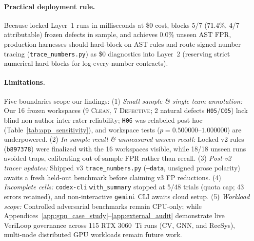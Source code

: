 \paragraph{Practical deployment rule.}
Because locked Layer~1 runs in milliseconds at \$0 cost, blocks 5/7 (71.4\%, 4/7 attributable) frozen defects in sample, and achieves 0.0\% unseen AST FPR, production harnesses should hard-block on AST rules and route signed number tracing (\texttt{trace\_numbers.py}) as \$0 diagnostics into Layer~2 (reserving strict numerical hard blocks for log-every-number contracts).

\paragraph{Limitations.}
Five boundaries scope our findings:
(1) \emph{Small sample \& single-team annotation:} Our 16 frozen workspaces (9 \textsc{Clean}, 7 \textsc{Defective}; 2 natural defects \texttt{H05}/\texttt{C05}) lack blind non-author inter-rater reliability; \texttt{H06} was relabeled post hoc (Table~\ref{tab:app_sensitivity}), and workspace tests ($p=0.500000$--$1.000000$) are underpowered.
(2) \emph{In-sample recall \& unmeasured unseen recall:} Locked v2 rules (\texttt{b897378}) were finalized with the 16 workspaces visible, while 18/18 unseen runs avoided traps, calibrating out-of-sample FPR rather than recall.
(3) \emph{Post-v2 tracer updates:} Shipped v3 \texttt{trace\_numbers.py} (\texttt{--data}, unsigned prose polarity) awaits a fresh held-out benchmark before claiming v3 FP reductions.
(4) \emph{Incomplete cells:} \texttt{codex-cli} \texttt{with\_summary} stopped at 5/48 trials (quota cap; 43 errors retained), and non-interactive \texttt{gemini} CLI awaits cloud setup.
(5) \emph{Workload scope:} Controlled adversarial benchmarks remain CPU-only; while Appendices~\ref{app:gpu_case_study}--\ref{app:external_audit} demonstrate live VeriLoop governance across 115 RTX 3060~Ti runs (CV, GNN, and RecSys), multi-node distributed GPU workloads remain future work.
